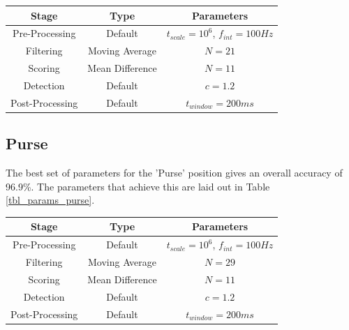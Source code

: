                 \begin{center}
                    \label{tbl_params_neck_pouch}
                    \begin{tabular}{|c|c|c|}
                        \hline
                        Stage & Type & Parameters \\
                        \hline
                        Pre-Processing & Default & $t_{scale}=10^6$, $f_{int}=100Hz$ \\
                        Filtering & Moving Average & $N=21$ \\
                        Scoring & Mean Difference & $N=11$ \\
                        Detection & Default & $c=1.2$ \\
                        Post-Processing & Default & $t_{window}=200ms$ \\
                        \hline
                    \end{tabular}
                \end{center}

            \subsection{Purse}

                The best set of parameters for the 'Purse' position gives an overall accuracy of 96.9\%. The parameters that achieve this are laid out in Table \ref{tbl_params_purse}.

                \begin{center}
                    \label{tbl_params_purse}
                    \begin{tabular}{|c|c|c|}
                        \hline
                        Stage & Type & Parameters \\
                        \hline
                        Pre-Processing & Default & $t_{scale}=10^6$, $f_{int}=100Hz$ \\
                        Filtering & Moving Average & $N=29$ \\
                        Scoring & Mean Difference & $N=11$ \\
                        Detection & Default & $c=1.2$ \\
                        Post-Processing & Default & $t_{window}=200ms$ \\
                        \hline
                    \end{tabular}
                \end{center}    



